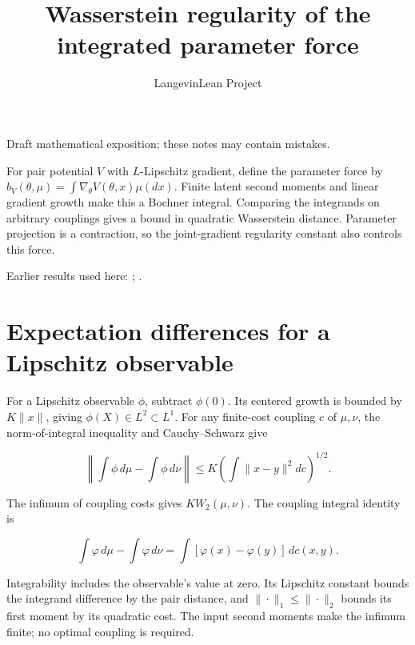 \documentclass[11pt,a4paper]{article}
\title{\texorpdfstring{Wasserstein regularity of the integrated parameter force}{Wasserstein regularity of the integrated parameter force}}
\author{LangevinLean Project}
\date{}
\begin{document}
\maketitle
Draft mathematical exposition; these notes may contain mistakes.


For pair potential \(V\) with \(L\)-Lipschitz gradient, define the parameter force by \(b_V(\theta,\mu)=\int\nabla_\theta V(\theta,x)\mu(dx)\). Finite latent second moments and linear gradient growth make this a Bochner integral. Comparing the integrands on arbitrary couplings gives a bound in quadratic Wasserstein distance. Parameter projection is a contraction, so the joint-gradient regularity constant also controls this force.



Earlier results used here: \cite[Section~3.21]{LangevinLean2026ULASC}; \cite[Section~3.22]{LangevinLean2026ULASC}.

\section{\texorpdfstring{Expectation differences for a Lipschitz observable}{Expectation differences for a Lipschitz observable}}


For a Lipschitz observable \(\phi\), subtract \(\phi(0)\). Its centered growth is bounded by \(K\|x\|\), giving \(\phi(X)\in L^2\subset L^1\). For any finite-cost coupling \(c\) of \(\mu,\nu\), the norm-of-integral inequality and Cauchy–Schwarz give

\[\left\|\int\phi\,d\mu-\int\phi\,d\nu\right\|\le K\left(\int\|x-y\|^2dc\right)^{1/2}.\]

The infimum of coupling costs gives \(K W_2(\mu,\nu)\). The coupling integral identity is

\[\int\varphi\,d\mu-\int\varphi\,d\nu=\int[\varphi(x)-\varphi(y)]\,dc(x,y).\]

Integrability includes the observable’s value at zero. Its Lipschitz constant bounds the integrand difference by the pair distance, and \(\|\cdot\|_1\le\|\cdot\|_2\) bounds its first moment by its quadratic cost. The input second moments make the infimum finite; no optimal coupling is required.
\end{document}
